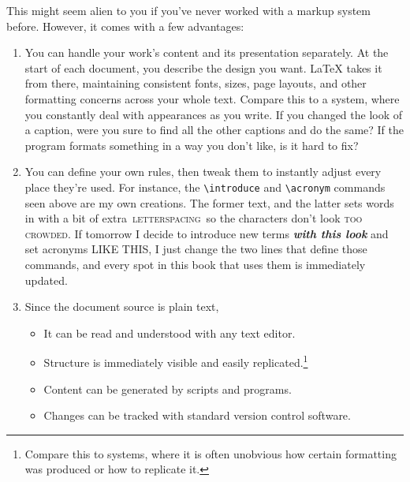 This might seem alien to you if you've never worked with a markup system before.
However, it comes with a few advantages:
\begin{enumerate}
\item You can handle your work's content and its presentation separately.
    At the start of each document,
    you describe the design you want.
    \LaTeX{} takes it from there, maintaining consistent
    fonts, sizes, page layouts, and other formatting concerns across your
    whole text.
    Compare this to a  system,
    where you constantly deal with appearances
    as you write.
    If you changed the look of a caption,
    were you sure to find all the other captions and do the
    same?
    If the program formats something in a way you don't like,
    is it hard to fix?%

\item You can define your own rules, then tweak them to instantly adjust
    every place they're used.
    For instance, the \verb|\introduce| and \verb|\acronym| commands seen above
    are my own creations. The former  text, and
    the latter sets words in  with a bit of extra
    \,\textsc{letterspacing}\, so the characters
    don't look \textsc{too crowded}.
    If tomorrow I decide to introduce new terms
    \textbf{\itshape with this look} and set acronyms
    {\small{} LIKE THIS},
    I just change the two lines that define those commands,
    and every spot in this book that uses them is immediately updated.

\item Since the document source is plain text,
    \begin{itemize}
    \item It can be read and understood with any text editor.
    \item Structure is immediately visible
        and easily replicated.\punckern\footnote{Compare this to
         systems, where it is often unobvious
        how certain formatting was produced or how to replicate it.}
    \item Content can be generated by scripts and programs.
    \item Changes can be tracked with standard version control software.
    \end{itemize}
\end{enumerate}


